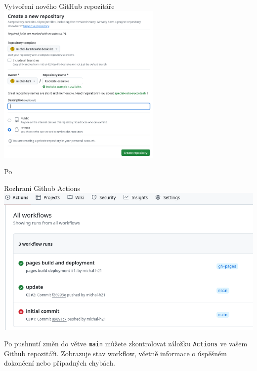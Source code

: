 \begin{frame}[fragile]{Vytvoření nového GitHub repozitáře}
  \includegraphics[width=0.6\textwidth,alt={Dialog vytvoření nového repozitáře ze šablony}]{img/new-repo.png}
\end{frame}

Po 


\begin{frame}[fragile]{Rozhraní Github Actions}
\includegraphics[width=\textwidth]{img/github-actions.png}
\end{frame}

Po pushnutí změn do větve \texttt{main} můžete zkontrolovat záložku
\texttt{Actions} ve vašem Github repozitáři. Zobrazuje stav workflow, včetně
informace o úspěšném dokončení nebo případných chybách.

